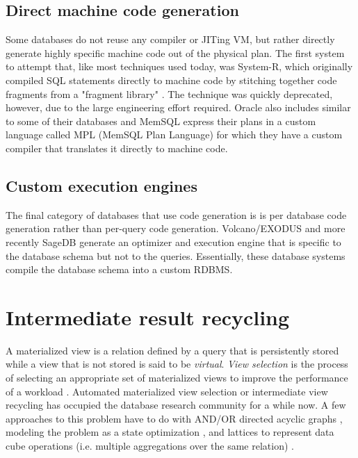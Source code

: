 \subsection{Direct machine code generation}

Some databases do not reuse any compiler or JITing VM, but rather
directly generate highly specific machine code out of the physical
plan. The first system to attempt that, like most techniques used
today, was System-R, which originally compiled SQL statements directly
to machine code by stitching together code fragments from a "fragment
library" \cite{chamberlinHistoryEvaluationSystem1981}. The technique was
quickly deprecated, however, due to the large engineering effort
required. Oracle also includes similar to some of their databases and
MemSQL express their plans in a custom language called MPL (MemSQL
Plan Language) for which they have a custom compiler that translates
it directly to machine code.

\subsection{Custom execution engines}

The final category of databases that use code generation is is per database
code generation rather than per-query code generation. Volcano/EXODUS
\cite{graefeVolcanoOptimizerGenerator1993a} and more recently SageDB
\cite{kraskaSageDBLearnedDatabase} generate an optimizer and execution
engine that is specific to the database schema but not to the queries.
Essentially, these database systems compile the database schema into a
custom RDBMS.

\section{Intermediate result recycling}

A materialized view is a relation defined by a query that is
persistently stored while a view that is not stored is said to be
\emph{virtual}. \emph{View selection} is the process of selecting an
appropriate set of materialized views to improve the performance of a
workload \cite{mamiSurveyViewSelection2012}.  Automated materialized
view selection or intermediate view recycling has occupied
the database research community for a while now. A few approaches to
this problem have to do with AND/OR directed acyclic graphs
\cite{guptaSelectionViewsMaterialize1997}, modeling the problem as a
state optimization \cite{theodoratosDataWarehouseConfiguration1997},
and lattices to represent data cube operations (i.e. multiple
aggregations over the same relation) \cite{ImplementingDataCubes}.

